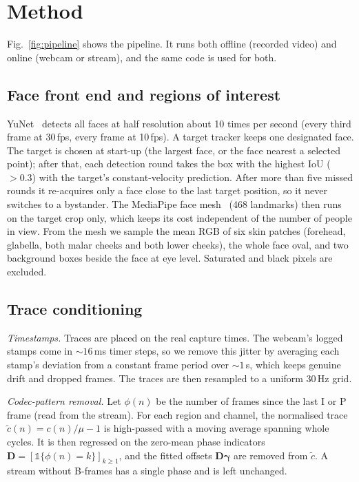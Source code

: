 \documentclass[conference]{IEEEtran}
\begin{document}
\section{Method}
Fig.~\ref{fig:pipeline} shows the pipeline. It runs both offline (recorded video) and online
(webcam or stream), and the same code is used for both.

\subsection{Face front end and regions of interest}
YuNet~\cite{wu2023yunet} detects all faces at half resolution about 10 times per second (every third
frame at 30\,fps, every frame at 10\,fps). A target tracker keeps one designated face. The target is
chosen at start-up (the largest face, or the face nearest a selected point); after that, each detection
round takes the box with the highest IoU ($>0.3$) with the target's constant-velocity prediction. After
more than five missed rounds it re-acquires only a face close to the last target position, so it never
switches to a bystander. The MediaPipe face mesh~\cite{kartynnik2019} (468 landmarks) then runs on the target crop only,
which keeps its cost independent of the number of people in view. From the mesh we sample the mean RGB
of six skin patches (forehead, glabella, both malar cheeks and both lower cheeks), the whole face oval,
and two background boxes beside the face at eye level. Saturated and black pixels are excluded.

\subsection{Trace conditioning}
\textit{Timestamps.} Traces are placed on the real capture times. The webcam's logged stamps come in
${\sim}16$\,ms timer steps, so we remove this jitter by averaging each stamp's deviation from a constant
frame period over ${\sim}1$\,s, which keeps genuine drift and dropped frames. The traces are then
resampled to a uniform 30\,Hz grid.

\textit{Codec-pattern removal.} Let $\phi(n)$ be the number of frames since the last I or P frame
(read from the stream). For each region and channel, the normalised trace $\tilde c(n)=c(n)/\mu-1$ is
high-passed with a moving average spanning whole cycles. It is then regressed on the zero-mean phase
indicators $\mathbf{D}=[\mathbb{1}\{\phi(n)=k\}]_{k\ge1}$, and the fitted offsets $\mathbf{D}\boldsymbol{\gamma}$
are removed from $\tilde c$. A stream without B-frames has a single phase and is left unchanged.
\end{document}
